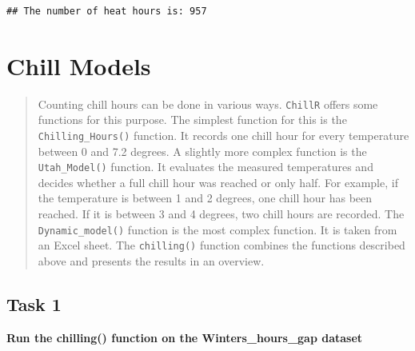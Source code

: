 \documentclass[
]{book}
\newenvironment{Shaded}{\begin{snugshade}}{\end{snugshade}}
\newcommand{\CommentTok}[1]{\textcolor[rgb]{0.56,0.35,0.01}{\textit{#1}}}
\newcommand{\DataTypeTok}[1]{\textcolor[rgb]{0.13,0.29,0.53}{#1}}
\newcommand{\DecValTok}[1]{\textcolor[rgb]{0.00,0.00,0.81}{#1}}
\newcommand{\KeywordTok}[1]{\textcolor[rgb]{0.13,0.29,0.53}{\textbf{#1}}}
\newcommand{\NormalTok}[1]{#1}
\newcommand{\OperatorTok}[1]{\textcolor[rgb]{0.81,0.36,0.00}{\textbf{#1}}}
\newcommand{\StringTok}[1]{\textcolor[rgb]{0.31,0.60,0.02}{#1}}
\begin{document}
\begin{verbatim}
## The number of heat hours is: 957
\end{verbatim}

\hypertarget{chill-models}{%
\chapter{Chill Models}\label{chill-models}}

\begin{quote}
Counting chill hours can be done in various ways. \texttt{ChillR} offers some functions for this purpose. The simplest function for this is the \texttt{Chilling\_Hours()} function. It records one chill hour for every temperature between 0 and 7.2 degrees.
A slightly more complex function is the \texttt{Utah\_Model()} function. It evaluates the measured temperatures and decides whether a full chill hour was reached or only half. For example, if the temperature is between 1 and 2 degrees, one chill hour has been reached. If it is between 3 and 4 degrees, two chill hours are recorded.
The \texttt{Dynamic\_model()} function is the most complex function. It is taken from an Excel sheet.
The \texttt{chilling()} function combines the functions described above and presents the results in an overview.
\end{quote}

\hypertarget{task-1-3}{%
\section{Task 1}\label{task-1-3}}

\textbf{Run the chilling() function on the Winters\_hours\_gap dataset}

\begin{Shaded}
\end{Shaded}
\end{document}
